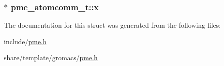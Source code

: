 \hypertarget{structpme__atomcomm__t_a10af7db834b7468338c94dcbc1fea186}{
\subsubsection[{x}]{ $\ast$ {\bf pme\-\_\-atomcomm\-\_\-t\-::x}}}\label{structpme__atomcomm__t_a10af7db834b7468338c94dcbc1fea186}


\-The documentation for this struct was generated from the following files\-:\begin{DoxyCompactItemize}
\item 
include/\hyperlink{include_2pme_8h}{pme.\-h}\item 
share/template/gromacs/\hyperlink{share_2template_2gromacs_2pme_8h}{pme.\-h}\end{DoxyCompactItemize}
